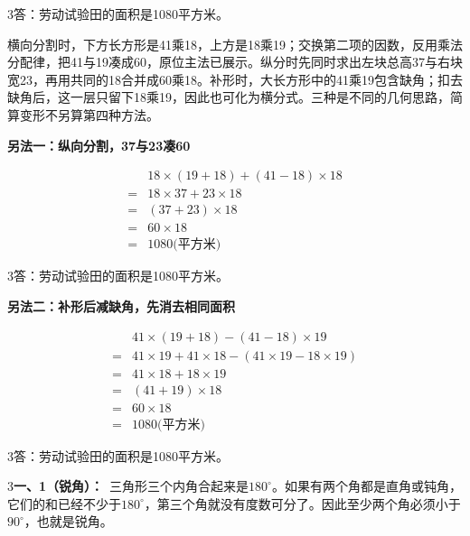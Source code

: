 \documentclass[multi=snippet,border={5bp 20bp 5bp 5bp}]{standalone}
\newenvironment{snippet}[3]{\begin{minipage}{#1bp}\color{answerred}\fontsize{#2}{#3}\selectfont\raggedright}{\end{minipage}}
\begin{document}
\begin{snippet}{505}{11.5}{14}\begin{multicols}{3}\raggedcolumns 答：劳动试验田的面积是1080平方米。\par 横向分割时，下方长方形是41乘18，上方是18乘19；交换第二项的因数，反用乘法分配律，把41与19凑成60，原位主法已展示。纵分时先同时求出左块总高37与右块宽23，再用共同的18合并成60乘18。补形时，大长方形中的41乘19包含缺角；扣去缺角后，这一层只留下18乘19，因此也可化为横分式。三种是不同的几何思路，简算变形不另算第四种方法。\par \textbf{另法一：纵向分割，37与23凑60}\par \end{multicols}\[\begin{aligned}&18\times(19+18)+(41-18)\times18\\={}&18\times37+23\times18\\={}&(37+23)\times18\\={}&60\times18\\={}&1080\text{(平方米)}\end{aligned}\]\begin{multicols}{3}\raggedcolumns 答：劳动试验田的面积是1080平方米。\par \textbf{另法二：补形后减缺角，先消去相同面积}\par \end{multicols}\[\begin{aligned}&41\times(19+18)-(41-18)\times19\\={}&41\times19+41\times18-(41\times19-18\times19)\\={}&41\times18+18\times19\\={}&(41+19)\times18\\={}&60\times18\\={}&1080\text{(平方米)}\end{aligned}\]\begin{multicols}{3}\raggedcolumns 答：劳动试验田的面积是1080平方米。\end{multicols}\end{snippet}
\begin{snippet}{505}{11.5}{14}\begin{multicols}{3}\raggedcolumns \textbf{一、1（锐角）：}\ 三角形三个内角合起来是\(180^\circ\)\allowbreak 。如果有两个角都是直角或钝角，它们的和已经不少于\(180^\circ\)\allowbreak ，第三个角就没有度数可分了。因此至少两个角必须小于\(90^\circ\)\allowbreak ，也就是锐角。\end{multicols}\end{snippet}
\end{document}
